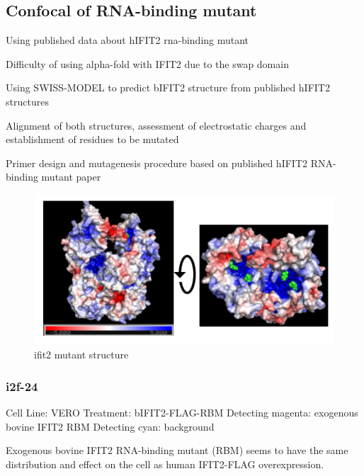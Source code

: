 \subsection{Confocal of RNA-binding mutant}
Using published data about hIFIT2 rna-binding mutant

Difficulty of using alpha-fold with IFIT2 due to the swap domain

Using SWISS-MODEL to predict bIFIT2 structure from published hIFIT2 structures

Alignment of both structures, assessment of electrostatic charges and establishment of residues to be mutated

Primer design and mutagenesis procedure based on published hIFIT2 RNA-binding mutant paper

\begin{figure}
    \centering
    \includegraphics[width=1\linewidth]{09. Chapter 4/Figs/05. IFIT2-RNA binding mutant/01. structure.png}
    \caption[ifit2 mutant structure]{ifit2 mutant structure}
    \label{ifit2 mutant structure}
\end{figure}

\subsubsection{i2f-24}
Cell Line: VERO
Treatment: bIFIT2-FLAG-RBM
Detecting magenta: exogenous bovine IFIT2 RBM
Detecting cyan: background

Exogenous bovine IFIT2 RNA-binding mutant (RBM) seems to have the same distribution and effect on the cell as human IFIT2-FLAG overexpression.

